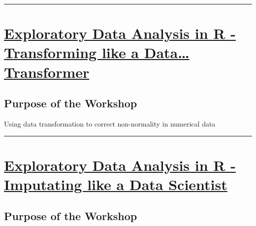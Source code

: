 \documentclass[
  letterpaper,
  DIV=11,
  numbers=noendperiod]{scrreprt}
\begin{document}
\begin{center}\rule{0.5\linewidth}{0.5pt}\end{center}

\hypertarget{exploratory-data-analysis-in-r---transforming-like-a-data-transformer}{%
\section*{\texorpdfstring{\href{https://github.com/Gchism94/Data7_EDA_In_R_Workshops/tree/main/Workshops/Fall2022/EDA_In_R_Fall3}{Exploratory
Data Analysis in R - Transforming like a Data\ldots{}
Transformer}}{Exploratory Data Analysis in R - Transforming like a Data\ldots{} Transformer}}\label{exploratory-data-analysis-in-r---transforming-like-a-data-transformer}}

\hypertarget{purpose-of-the-workshop-1}{%
\subsection*{Purpose of the Workshop}\label{purpose-of-the-workshop-1}}

Using data transformation to correct non-normality in numerical data

\begin{center}\rule{0.5\linewidth}{0.5pt}\end{center}

\hypertarget{exploratory-data-analysis-in-r---imputating-like-a-data-scientist}{%
\section*{\texorpdfstring{\href{https://github.com/Gchism94/Data7_EDA_In_R_Workshops/tree/main/Workshops/Fall2022/EDA_In_R_Fall4}{Exploratory
Data Analysis in R - Imputating like a Data
Scientist}}{Exploratory Data Analysis in R - Imputating like a Data Scientist}}\label{exploratory-data-analysis-in-r---imputating-like-a-data-scientist}}

\hypertarget{purpose-of-the-workshop-2}{%
\subsection*{Purpose of the Workshop}\label{purpose-of-the-workshop-2}}
\end{document}
